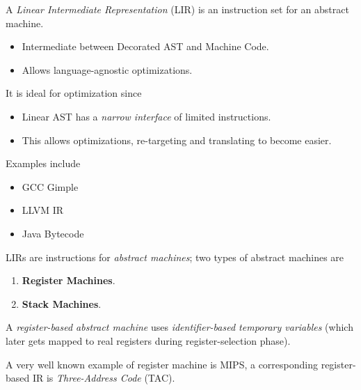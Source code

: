 \begin{definition}[Linear IR]
    A \textit{Linear Intermediate Representation} (LIR) is an instruction set for an abstract machine.
    
    \begin{itemize}[topsep=4pt]
        \item Intermediate between Decorated AST and Machine Code.
        \item Allows language-agnostic optimizations.
    \end{itemize}
    
    It is ideal for optimization since
    \begin{itemize}[topsep=4pt]
        \item Linear AST has a \textit{narrow interface} of limited instructions.
        \item This allows optimizations, re-targeting and translating to become easier.
    \end{itemize}
    
    Examples include
    \begin{itemize}
        \item GCC Gimple
        \item LLVM IR
        \item Java Bytecode
    \end{itemize}
\end{definition}

\begin{definition}
    LIRs are instructions for \textit{abstract machines}; two types of abstract machines are
    \begin{enumerate}
        \item \textbf{Register Machines}.
        \item \textbf{Stack Machines}.
    \end{enumerate}
\end{definition}

\begin{definition}
    A \textit{register-based abstract machine} uses \textit{identifier-based temporary variables} (which later gets mapped to real registers during register-selection phase).
\end{definition}

\begin{example}
    A very well known example of register machine is MIPS, a corresponding register-based IR is \textit{Three-Address Code} (TAC).
\end{example}

